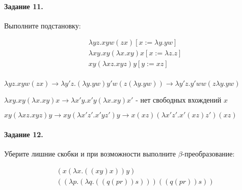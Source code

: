 \documentclass[a4paper,12pt]{article}
\begin{document}
\paragraph{Задание 11.} Выполните подстановку:

\[
	\begin{split}
		&\lambda yz . xyw\left(zx\right) \left[x := \lambda y . yw\right]\\
		&\lambda xy . xy \left(\lambda x . xy\right)x \left[x := \lambda z . z\right]\\
		&xy \left(\lambda xz . xyz\right) y \left[y := xz\right]\\
	\end{split}
\]

\begin{Solution}

$\lambda yz . xyw\left(zx\right) \rightarrow \lambda y'z . \left(\lambda y . yw\right)y'w\left(z\left(\lambda y . yw\right)\right) \rightarrow \lambda y'z . y'ww\left(z\lambda y . yw\right)$

$\lambda xy . xy \left(\lambda x . xy\right)x \rightarrow \lambda x'y . x'y \left(\lambda x . xy\right)x'$ - нет свободных вхождений $x$

$xy \left(\lambda xz . xyz\right) y \rightarrow xy \left(\lambda x'z' . x'yz'\right) y \rightarrow x\left(xz\right) \left(\lambda x'z' . x'\left(xz\right)z'\right) \left(xz\right)$

\end{Solution}

\paragraph{Задание 12.} Уберите лишние скобки и при возможности выполните $\beta$-преобразование:

\[
	\begin{split}
		&\left(x\left(\lambda x . \left(\left(xy\right)x\right)\right)y\right)\\
		&\left(\left(\lambda p.\left(\lambda q .\left(\left(q\left(pr\right)\right)s\right)\right)\right)\left(\left(q\left(pr\right)\right)s\right)\right)
	\end{split}
\]
\end{document}
